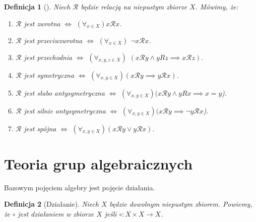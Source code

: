 \documentclass[12pt,a4paper]{report}
\newtheorem{definition}{Definicja}[chapter]
\begin{document}
\begin{definition}[{\citep[Sec 6.2]{kraszewski2007wstkep}}]
Niech $\mathcal{R}$ będzie relacją na niepustym zbiorze $X$. Mówimy, że:
\begin{enumerate}
\item
$\mathcal{R}$ jest zwrotna $\iff$ $(\forall_{x\in X}) x\mathcal{R}x$.
\item
$\mathcal{R}$ jest przeciwzwrotna $\iff$ $(\forall_{x\in X})$ $\neg x\mathcal{R}x$.
\item
$\mathcal{R}$ jest przechodnia $\iff$ $(\forall_{x,y,z\in X})$ $(x\mathcal{R}y\land yRz  \implies x\mathcal{R}z)$.
\item
$\mathcal{R}$ jest symetryczna $\iff$ $(\forall_{x,y\in X})(x\mathcal{R}y \implies y\mathcal{R}x)$. 
\item
$\mathcal{R}$ jest słabo antysymetryczna $\iff$ $(\forall_{x,y\in X})( x\mathcal{R}y \land yRx \implies x=y$).
\item
$\mathcal{R}$ jest silnie antysymetryczna $\iff$ $(\forall_{x,y\in X})(x\mathcal{R}y \implies \neg y\mathcal{R}x$).
\item
$\mathcal{R}$ jest spójna $\iff$ $(\forall_{x,y\in X})(x\mathcal{R}y \lor y\mathcal{R}x)$.

\end{enumerate}
\end{definition}
\section{Teoria grup algebraicznych}

Bazowym pojęciem algebry jest pojęcie działania.

\begin{definition}[Działanie{\citep[Sec 4.1]{jedrzejewski2011algebra}}]
Niech $X$ będzie dowolnym niepustym zbiorem. Powiemy, że $\circ$ jest działaniem w zbiorze $X$ jeśli $\circ: X \times X \to X$.
\end{definition}
\end{document}
